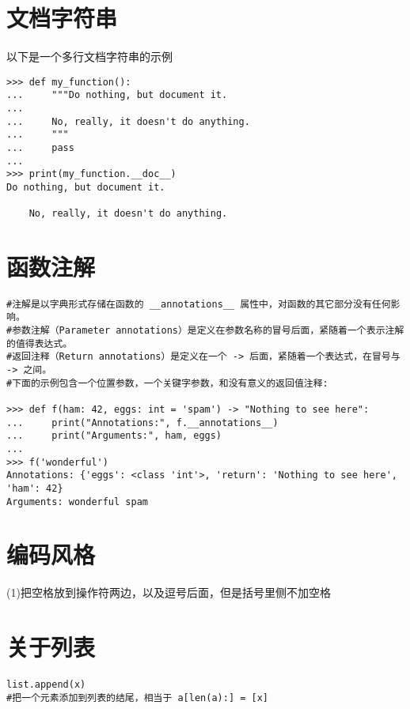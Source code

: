 \documentclass{article}
\begin{document}
\begin{CJK}{UTF8}{gbsn}
\section{文档字符串}
\paragraph{}
以下是一个多行文档字符串的示例
\begin{verbatim}
>>> def my_function():
...     """Do nothing, but document it.
...
...     No, really, it doesn't do anything.
...     """
...     pass
...
>>> print(my_function.__doc__)
Do nothing, but document it.

    No, really, it doesn't do anything.
\end{verbatim}
\section{函数注解}
\paragraph{}
\begin{verbatim}
#注解是以字典形式存储在函数的 __annotations__ 属性中，对函数的其它部分没有任何影响。
#参数注解（Parameter annotations）是定义在参数名称的冒号后面，紧随着一个表示注解的值得表达式。
#返回注释（Return annotations）是定义在一个 -> 后面，紧随着一个表达式，在冒号与 -> 之间。
#下面的示例包含一个位置参数，一个关键字参数，和没有意义的返回值注释:

>>> def f(ham: 42, eggs: int = 'spam') -> "Nothing to see here":
...     print("Annotations:", f.__annotations__)
...     print("Arguments:", ham, eggs)
...
>>> f('wonderful')
Annotations: {'eggs': <class 'int'>, 'return': 'Nothing to see here', 'ham': 42}
Arguments: wonderful spam
\end{verbatim}
\section{编码风格}
(1)把空格放到操作符两边，以及逗号后面，但是括号里侧不加空格
\paragraph{}
\section{关于列表}
\paragraph{}
\begin{verbatim}
list.append(x)
#把一个元素添加到列表的结尾，相当于 a[len(a):] = [x]

\end{verbatim}
\end{CJK}
\end{document}
